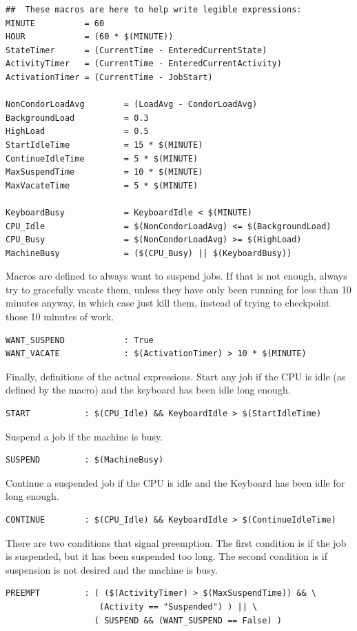 \begin{verbatim}
##  These macros are here to help write legible expressions:
MINUTE          = 60
HOUR            = (60 * $(MINUTE))
StateTimer      = (CurrentTime - EnteredCurrentState)
ActivityTimer   = (CurrentTime - EnteredCurrentActivity)
ActivationTimer = (CurrentTime - JobStart)

NonCondorLoadAvg        = (LoadAvg - CondorLoadAvg)
BackgroundLoad          = 0.3
HighLoad                = 0.5
StartIdleTime           = 15 * $(MINUTE)
ContinueIdleTime        = 5 * $(MINUTE)
MaxSuspendTime          = 10 * $(MINUTE)
MaxVacateTime           = 5 * $(MINUTE)

KeyboardBusy            = KeyboardIdle < $(MINUTE)
CPU_Idle                = $(NonCondorLoadAvg) <= $(BackgroundLoad)
CPU_Busy                = $(NonCondorLoadAvg) >= $(HighLoad)
MachineBusy             = ($(CPU_Busy) || $(KeyboardBusy))
\end{verbatim}

Macros are defined to always want to suspend jobs.
If that is not enough, always try to gracefully vacate them,
unless they have only been running for less than 10 minutes anyway, in
which case just kill them, instead of trying to checkpoint those
10 minutes of work.
\begin{verbatim}
WANT_SUSPEND            : True
WANT_VACATE             : $(ActivationTimer) > 10 * $(MINUTE)
\end{verbatim}

Finally, definitions of the actual expressions.
Start any job if the CPU is idle (as defined by the macro)
and the keyboard has been idle long enough.
\begin{verbatim}
START           : $(CPU_Idle) && KeyboardIdle > $(StartIdleTime)
\end{verbatim}

Suspend a job if the machine is busy.
\begin{verbatim}
SUSPEND         : $(MachineBusy)
\end{verbatim}

Continue a suspended job if the CPU is idle and the Keyboard has been
idle for long enough.
\begin{verbatim}
CONTINUE        : $(CPU_Idle) && KeyboardIdle > $(ContinueIdleTime)
\end{verbatim}

There are two conditions that signal preemption.
The first condition is if the job is suspended,
but it has been suspended too long.
The second condition is if suspension is not desired and the machine is busy. 
\begin{verbatim}
PREEMPT	        : ( ($(ActivityTimer) > $(MaxSuspendTime)) && \
                   (Activity == "Suspended") ) || \
                  ( SUSPEND && (WANT_SUSPEND == False) )
\end{verbatim}

